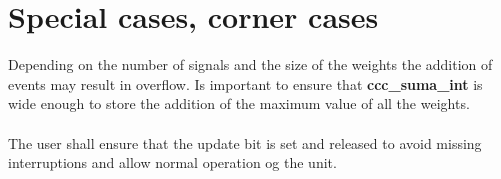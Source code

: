 \section{Special cases, corner cases}
Depending on the number of signals and the size of the weights the addition of events may result in overflow. Is important to ensure that \textbf{ccc\_suma\_int} is wide enough to store the addition of the maximum value of all the weights.\\
\\
The user shall ensure that the update bit is set and released to avoid missing interruptions and allow normal operation og the unit.\\
\\
